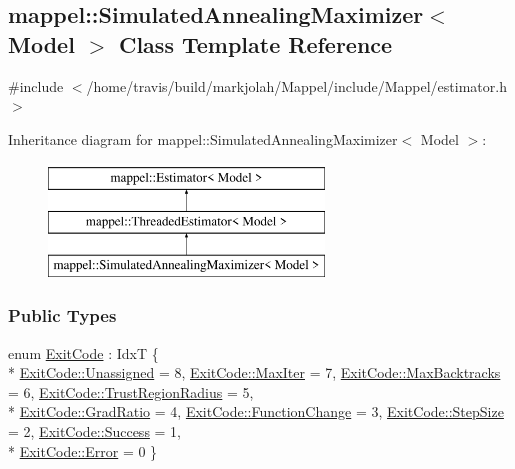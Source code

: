 \hypertarget{classmappel_1_1SimulatedAnnealingMaximizer}{}\subsection{mappel\+:\+:Simulated\+Annealing\+Maximizer$<$ Model $>$ Class Template Reference}
\label{classmappel_1_1SimulatedAnnealingMaximizer}


{\ttfamily \#include $<$/home/travis/build/markjolah/\+Mappel/include/\+Mappel/estimator.\+h$>$}

Inheritance diagram for mappel\+:\+:Simulated\+Annealing\+Maximizer$<$ Model $>$\+:\begin{figure}[H]
\begin{center}
\leavevmode
\includegraphics[height=3.000000cm]{classmappel_1_1SimulatedAnnealingMaximizer}
\end{center}
\end{figure}
\subsubsection*{Public Types}
\begin{DoxyCompactItemize}
\item 
enum \hyperlink{classmappel_1_1Estimator_a6d599915907ba4d0607fcb958d231edc}{Exit\+Code} \+: IdxT \{ \\*
\hyperlink{classmappel_1_1Estimator_a6d599915907ba4d0607fcb958d231edca3476bf9c3af766198bfbd4f065a51e69}{Exit\+Code\+::\+Unassigned} = 8, 
\hyperlink{classmappel_1_1Estimator_a6d599915907ba4d0607fcb958d231edcabbf52264f7a6e91c48a242f95aeed3db}{Exit\+Code\+::\+Max\+Iter} = 7, 
\hyperlink{classmappel_1_1Estimator_a6d599915907ba4d0607fcb958d231edca9e5d3183756d69b44432394db6b6fd86}{Exit\+Code\+::\+Max\+Backtracks} = 6, 
\hyperlink{classmappel_1_1Estimator_a6d599915907ba4d0607fcb958d231edcaadd208e6fbd6ef5ab84a287f259c3b81}{Exit\+Code\+::\+Trust\+Region\+Radius} = 5, 
\\*
\hyperlink{classmappel_1_1Estimator_a6d599915907ba4d0607fcb958d231edca8d0cc41d71102a7952fefe3c63244fd4}{Exit\+Code\+::\+Grad\+Ratio} = 4, 
\hyperlink{classmappel_1_1Estimator_a6d599915907ba4d0607fcb958d231edca8d75b053f108781c02ac7c22facc4338}{Exit\+Code\+::\+Function\+Change} = 3, 
\hyperlink{classmappel_1_1Estimator_a6d599915907ba4d0607fcb958d231edca071449462d0c247e47313eb8c3129dd0}{Exit\+Code\+::\+Step\+Size} = 2, 
\hyperlink{classmappel_1_1Estimator_a6d599915907ba4d0607fcb958d231edca505a83f220c02df2f85c3810cd9ceb38}{Exit\+Code\+::\+Success} = 1, 
\\*
\hyperlink{classmappel_1_1Estimator_a6d599915907ba4d0607fcb958d231edca902b0d55fddef6f8d651fe1035b7d4bd}{Exit\+Code\+::\+Error} = 0
 \}
\end{DoxyCompactItemize}
